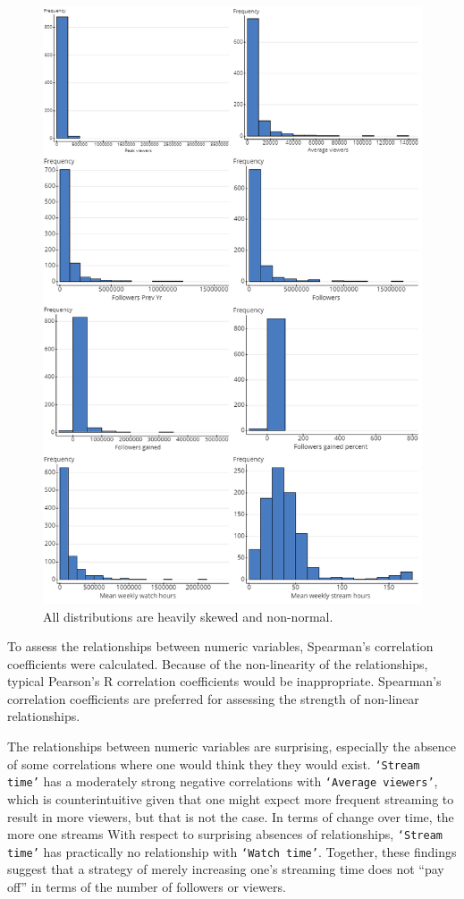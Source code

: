 \documentclass[12pt]{article}
\begin{document}
\begin{figure}[b]
  \centering
  \includegraphics[width=0.8\linewidth]{../StatCrunch_Results/Histogram_Matrix.png}
  \captionsetup{justification=centering, singlelinecheck=false, margin=2cm}
  \caption[Histogram Matrix]{All distributions are heavily skewed and non-normal.}
  \label{fig:histogram_matrix}
\end{figure}

To assess the relationships between numeric variables, Spearman’s correlation coefficients were calculated. Because of the non-linearity of the relationships, typical Pearson’s R correlation coefficients would be inappropriate. Spearman’s correlation coefficients are preferred for assessing the strength of non-linear relationships.

The relationships between numeric variables are surprising, especially the absence of some correlations where one would think they they would exist. \texttt{`Stream time’} has a moderately strong negative correlations with \texttt{`Average viewers’}, which is counterintuitive given that one might expect more frequent streaming to result in more viewers, but that is not the case. In terms of change over time, the more one streams With respect to surprising absences of relationships, \texttt{`Stream time’} has practically no relationship with \texttt{`Watch time’}. Together, these findings suggest that a strategy of merely increasing one’s streaming time does not “pay off” in terms of the number of followers or viewers.
\end{document}
